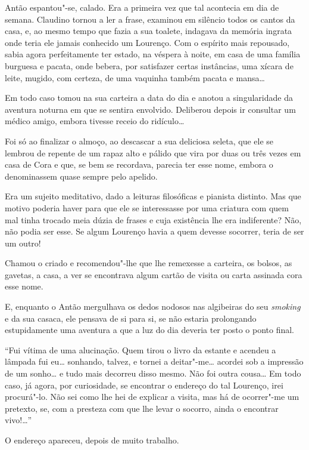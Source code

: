 Antão espantou"-se, calado. Era a primeira vez que tal acontecia em dia
de semana. Claudino tornou a ler a frase, examinou em silêncio todos os
cantos da casa, e, ao mesmo tempo que fazia a sua toalete, indagava da
memória ingrata onde teria ele jamais conhecido um Lourenço. Com o
espírito mais repousado, sabia agora perfeitamente ter estado, na
véspera à noite, em casa de uma família burguesa e pacata, onde bebera,
por satisfazer certas instâncias, uma xícara de leite, mugido, com
certeza, de uma vaquinha também pacata e mansa\ldots{}

Em todo caso tomou na sua carteira a data do dia e anotou a
singularidade da aventura noturna em que se sentira envolvido. Deliberou
depois ir consultar um médico amigo, embora tivesse receio do
ridículo\ldots{}

Foi só ao finalizar o almoço, ao descascar a sua deliciosa seleta, que
ele se lembrou de repente de um rapaz alto e pálido que vira por duas ou
três vezes em casa de Cora e que, se bem se recordava, parecia ter esse
nome, embora o denominassem quase sempre pelo apelido.

Era um sujeito meditativo, dado a leituras filosóficas e pianista
distinto. Mas que motivo poderia haver para que ele se interessasse por
uma criatura com quem mal tinha trocado meia dúzia de frases e cuja
existência lhe era indiferente? Não, não podia ser esse. Se algum
Lourenço havia a quem devesse socorrer, teria de ser um outro!

Chamou o criado e recomendou"-lhe que lhe remexesse a carteira, os
bolsos, as gavetas, a casa, a ver se encontrava algum cartão de visita
ou carta assinada cora esse nome.

E, enquanto o Antão mergulhava os dedos nodosos nas algibeiras do seu
\emph{smoking} e da sua casaca, ele pensava de si para si, se não
estaria prolongando estupidamente uma aventura a que a luz do dia
deveria ter posto o ponto final.

``Fui vítima de uma alucinação. Quem tirou o livro da estante e acendeu
a lâmpada fui eu\ldots{} sonhando, talvez, e tornei a deitar"-me\ldots{} acordei
sob a impressão de um sonho\ldots{} e tudo mais decorreu disso mesmo. Não foi
outra cousa\ldots{} Em todo caso, já agora, por curiosidade, se encontrar o
endereço do tal Lourenço, irei procurá"-lo. Não sei como lhe hei de
explicar a visita, mas há de ocorrer"-me um pretexto, se, com a presteza
com que lhe levar o socorro, ainda o encontrar vivo!\ldots{}''

O endereço apareceu, depois de muito trabalho.

